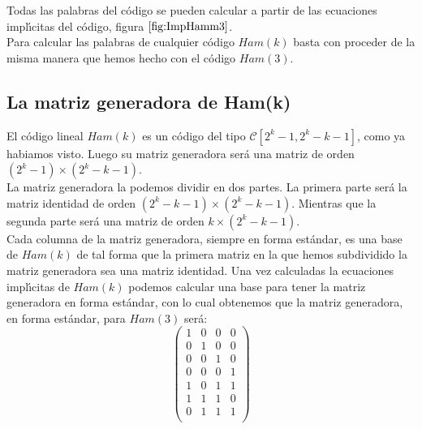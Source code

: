 Todas las palabras del c\'odigo se pueden calcular a partir de las ecuaciones
impl\'{\i}citas del c\'odigo, figura $\ref{fig:ImpHamm3}$.\\

Para calcular las palabras de cualquier c\'odigo $Ham(k)$ basta con proceder de
la misma manera que hemos hecho con el c\'odigo $Ham(3)$.

\subsection{La matriz generadora de Ham(k)}

El c\'odigo lineal $Ham(k)$ es un c\'odigo del tipo
$\mathcal{C}[2^k-1,2^k-k-1]$, como ya habiamos visto. Luego su matriz generadora
ser\'a una matriz de orden $(2^k-1)\times(2^k-k-1)$.\\

La matriz generadora la podemos dividir en dos partes. La primera parte ser\'a
la matriz identidad de orden $(2^k-k-1)\times(2^k-k-1)$. Mientras que la
segunda parte ser\'a una matriz de orden $k\times(2^k-k-1)$.\\

Cada columna de la matriz generadora, siempre en forma est\'andar, es una base
de $Ham(k)$ de tal forma que la primera matriz en la que hemos subdividido la
matriz generadora sea una matriz identidad. Una vez calculadas la ecuaciones
impl\'{\i}citas de $Ham(k)$ podemos calcular una base para tener la matriz
generadora en forma est\'andar, con lo cual obtenemos que la matriz generadora,
en forma est\'andar, para $Ham(3)$ ser\'a:
\begin{displaymath}
\left( \begin{array}{cccc}
1&0&0&0\\
0&1&0&0\\
0&0&1&0\\
0&0&0&1\\
1&0&1&1\\
1&1&1&0\\
0&1&1&1\\
\end{array} \right)
\end{displaymath}
